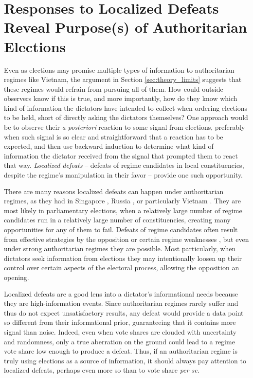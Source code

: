 \documentclass[12pt]{article}
\newcommand{\1}{\mathbbm{1}}
\begin{document}
\section{Responses to Localized Defeats Reveal Purpose(s) of Authoritarian Elections}
\label{sec:theory_local_defeat}

Even as elections may promise multiple types of information to authoritarian regimes like Vietnam, the argument in Section \ref{sec:theory_limits} suggests that these regimes would refrain from pursuing all of them. How could outside observers know if this is true, and more importantly, how do they know which kind of information the dictators have intended to collect when ordering elections to be held, short of directly asking the dictators themselves? One approach would be to observe their \textit{a posteriori} reaction to some signal from elections, preferably when such signal is so clear and straightforward that a reaction has to be expected, and then use backward induction to determine what kind of information the dictator received from the signal that prompted them to react that way. \textit{Localized defeats} -- defeats of regime candidates in local constituencies, despite the regime's manipulation in their favor -- provide one such opportunity.

There are many reasons localized defeats can happen under authoritarian regimes, as they had in Singapore \citep{TK}, Russia \citep{TK}, or particularly Vietnam \citep{TK}. They are most likely in parliamentary elections, when a relatively large number of regime candidates run in a relatively large number of constituencies, creating many opportunities for any of them to fail. Defeats of regime candidates often result from effective strategies by the opposition \citep{BunceWolchik2010} or certain regime weaknesses \citep{LevistkyWay2010}, but even under strong authoritarian regimes they are possible. Most particularly, when dictators seek information from elections they may intentionally loosen up their control over certain aspects of the electoral process, allowing the opposition an opening.

Localized defeats are a good lens into a dictator's informational needs because they are high-information events. Since authoritarian regimes rarely suffer and thus do not expect unsatisfactory results, any defeat would provide a data point so different from their informational prior, guaranteeing that it contains more signal than noise. Indeed, even when vote shares are clouded with uncertainty and randomness, only a true aberration on the ground could lead to a regime vote share low enough to produce a defeat. Thus, if an authoritarian regime is truly using elections as a source of information, it should always pay attention to localized defeats, perhaps even more so than to vote share \textit{per se}. 
\end{document}
